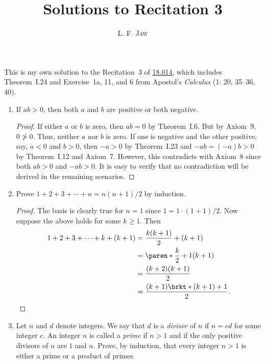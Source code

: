 \documentclass[a4paper]{article}
\title{Solutions to Recitation 3}
\author{L. F. \textsc{Jaw}}
\begin{document}
\maketitle

This is my own solution to the Recitation~3 of
\href{https://ocw.mit.edu/courses/mathematics/18-014-calculus-with-theory-fall-2010/recitations/}{18.014},
which includes Theorem~I.24 and Exercise~1a, 11, and 6 from Apostol's
\textit{Calculus} (1: 20, 35--36, 40).

\begin{enumerate}
\item If \(ab > 0\), then both \(a\) and \(b\) are positive or both
  negative.

  \begin{proof}
    If either \(a\) or \(b\) is zero, then \(ab = 0\) by Theorem~I.6.  But
    by Axiom~9, \(0 \ngtr 0\).  Thus, neither \(a\) nor \(b\) is zero.  If
    one is negative and the other positive, say, \(a < 0\) and \(b > 0\),
    then \(-a > 0\) by Theorem~I.23 and \(-ab = (-a)b > 0\) by Theorem~I.12
    and Axiom~7.  However, this contradicts with Axiom~8 since both
    \(ab > 0\) and \(-ab >0\).  It is easy to verify that no contradiction
    will be derived in the remaining scenarios.  %
  \end{proof}
  
\item Prove \(1 + 2 + 3 + \dotsb + n = n(n+1)/2 \) by induction.

  \begin{proof}
    The basis is clearly true for \(n = 1\) since \(1 = 1 \cdot (1+1)/2\).
    Now suppose the above holds for some \(k \ge 1\).  Then
    \begin{align*}
      1 + 2 + 3 + \dotsb + k + (k+1)
        &= \frac{k(k+1)}{2} + (k+1) \\
        &= \paren*{\frac{k}{2} + 1} (k+1) \\
        &= \frac{(k+2)(k+1)}{2} \\
        &= \frac{(k+1)\brkt*{(k+1)+1}}{2}. \qedhere
    \end{align*}
  \end{proof}
  
\item Let \(n\) and \(d\) denote integers.  We say that \(d\) is a
  \emph{divisor} of \(n\) if \(n = cd\) for some integer \(c\).  An
  integer \(n\) is called a \emph{prime} if \(n > 1\) and if the only
  positive divisors of \(n\) are \(1\) and \(n\).  Prove, by induction,
  that every integer \(n > 1\) is either a prime or a product of primes.


\end{enumerate}
\end{document}
